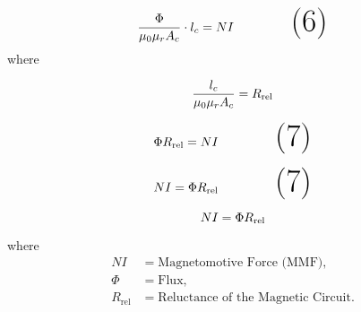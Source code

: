 \documentclass{article}
\begin{document}
\vspace{0.5cm} %
\begin{equation}
   \Huge  \frac{\Phi}{\mu_0 \mu_rA_c} \cdot {l_c}= NI \tag{6}
\end{equation}\vspace{0.5cm} %
where

\begin{tcolorbox}[colframe=black, boxrule=1mm, sharp corners=south] %
\[
   \Huge \frac{l_c}{\mu_0 \mu_r A_c} = R_\text{rel}
\]
\end{tcolorbox}

\vspace{0.5cm} %
\begin{equation}
   \Huge  {\Phi}R_\text{rel}= NI \tag{7}
\end{equation}\vspace{0.5cm} %

\vspace{0.5cm} %
\begin{equation}
   \Huge NI  = {\Phi}R_\text{rel}\tag{7}
\end{equation}\vspace{0.5cm} %

\begin{tcolorbox}[colframe=red, boxrule=1mm, sharp corners=south] %
\[
   \Huge NI= {\Phi}R_\text{rel}
\]
\end{tcolorbox}

\noindent
where 
\begin{align*}
NI &= \text{Magnetomotive Force (MMF)}, \\
\Phi &= \text{Flux}, \\
R_\text{rel} &= \text{Reluctance of the Magnetic Circuit}.
\end{align*}
\end{document}
